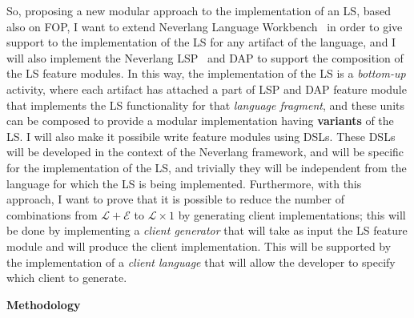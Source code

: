So, proposing a new modular approach to the implementation of an LS, based also on FOP, I want to extend Neverlang Language Workbench~\cite{Cazzola15c, Cazzola14c} in order to give support to the implementation of the LS for any artifact of the language, and I will also implement the Neverlang LSP~\cite{Cazzola19} and DAP to support the composition of the LS feature modules.
In this way, the implementation of the LS is a \textit{bottom-up} activity, where each artifact has attached a part of LSP and DAP feature module that implements the LS functionality for that \textit{language fragment}, and these units can be composed to provide a modular implementation having \textbf{variants} of the LS.
I will also make it possibile write feature modules using DSLs.
These DSLs will be developed in the context of the Neverlang framework, and will be specific for the implementation of the LS, and trivially they will be independent from the language for which the LS is being implemented.
Furthermore, with this approach, I want to prove that it is possible to reduce the number of combinations from $\mathcal{L} + \mathcal{E}$ to $\mathcal{L} \times 1$ by generating client implementations; this will be done by implementing a \textit{client generator} that will take as input the LS feature module and will produce the client implementation. This will be supported by the implementation of a \textit{client language} that will allow the developer to specify which client to generate.

\hfill \break
\noindent
\textbf{Methodology}


